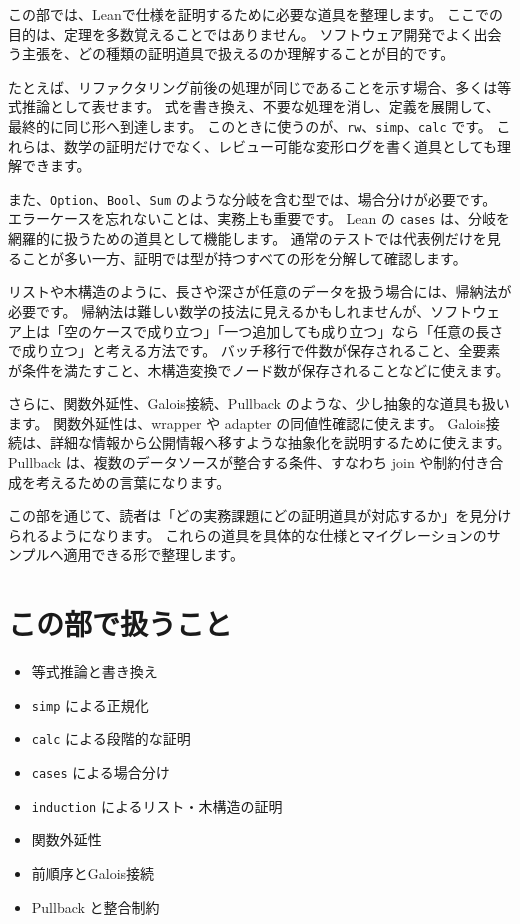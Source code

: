 
この部では、Leanで仕様を証明するために必要な道具を整理します。
ここでの目的は、定理を多数覚えることではありません。
ソフトウェア開発でよく出会う主張を、どの種類の証明道具で扱えるのか理解することが目的です。

たとえば、リファクタリング前後の処理が同じであることを示す場合、多くは等式推論として表せます。
式を書き換え、不要な処理を消し、定義を展開して、最終的に同じ形へ到達します。
このときに使うのが、\texttt{rw}、\texttt{simp}、\texttt{calc} です。
これらは、数学の証明だけでなく、レビュー可能な変形ログを書く道具としても理解できます。

また、\texttt{Option}、\texttt{Bool}、\texttt{Sum} のような分岐を含む型では、場合分けが必要です。
エラーケースを忘れないことは、実務上も重要です。
Lean の \texttt{cases} は、分岐を網羅的に扱うための道具として機能します。
通常のテストでは代表例だけを見ることが多い一方、証明では型が持つすべての形を分解して確認します。

リストや木構造のように、長さや深さが任意のデータを扱う場合には、帰納法が必要です。
帰納法は難しい数学の技法に見えるかもしれませんが、ソフトウェア上は「空のケースで成り立つ」「一つ追加しても成り立つ」なら「任意の長さで成り立つ」と考える方法です。
バッチ移行で件数が保存されること、全要素が条件を満たすこと、木構造変換でノード数が保存されることなどに使えます。

さらに、関数外延性、Galois接続、Pullback のような、少し抽象的な道具も扱います。
関数外延性は、wrapper や adapter の同値性確認に使えます。
Galois接続は、詳細な情報から公開情報へ移すような抽象化を説明するために使えます。
Pullback は、複数のデータソースが整合する条件、すなわち join や制約付き合成を考えるための言葉になります。

この部を通じて、読者は「どの実務課題にどの証明道具が対応するか」を見分けられるようになります。
これらの道具を具体的な仕様とマイグレーションのサンプルへ適用できる形で整理します。

\section*{この部で扱うこと}

\begin{itemize}
\item 等式推論と書き換え
\item \texttt{simp} による正規化
\item \texttt{calc} による段階的な証明
\item \texttt{cases} による場合分け
\item \texttt{induction} によるリスト・木構造の証明
\item 関数外延性
\item 前順序とGalois接続
\item Pullback と整合制約
\end{itemize}
